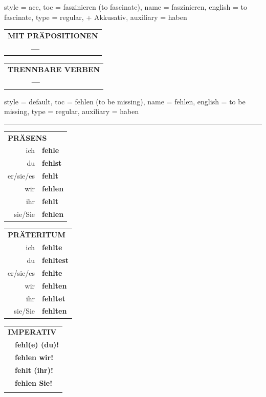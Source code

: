 \begin{verbentry}{
  style = {acc},
  toc = {faszinieren (to fascinate)},
  name = {faszinieren},
  english = {to fascinate},
  type = {regular, + Akkusativ},
  auxiliary = {haben}
}
\vspace{10pt}

\begin{tabular}{lll}
\multicolumn{3}{l}{\textbf{MIT PRÄPOSITIONEN}}\\
& \textbf{---} & \\
\end{tabular}
\hfill
\begin{tabular}{lll}
\multicolumn{3}{l}{\textbf{TRENNBARE VERBEN}}\\
& \textbf{---} & \\
\end{tabular}

\vspace{-5pt}
\end{verbentry}

\begin{verbentry}{
  style = {default},
  toc = {fehlen (to be missing)},
  name = {fehlen},
  english = {to be missing},
  type = {regular},
  auxiliary = {haben}
}
 
    
     \vspace{5pt}

    \hrule
    
    \vspace{5pt}

  \begin{tabular}{rl}
     \multicolumn{2}{l}{\textbf{PRÄSENS} }\\
    ich & \textbf{fehle}\\
    du & \textbf{fehlst}\\
    er/sie/es & \textbf{fehlt}\\
    wir & \textbf{fehlen}\\
    ihr & \textbf{fehlt}\\
    sie/Sie & \textbf{fehlen}\\
  \end{tabular}
  \hfill
     \begin{tabular}{rl}
    \multicolumn{2}{l}{\textbf{PRÄTERITUM} }\\
    ich & \textbf{fehlte}\\
    du & \textbf{fehltest}\\
    er/sie/es & \textbf{fehlte}\\
    wir & \textbf{fehlten}\\
    ihr & \textbf{fehltet}\\
    sie/Sie & \textbf{fehlten}\\
  \end{tabular}
  \hfill
  \begin{tabular}{rl}
     \multicolumn{2}{l}{\textbf{IMPERATIV} }\\
   & \textbf{fehl(e) (du)!}\\
   & \textbf{fehlen wir!}\\
   & \textbf{fehlt (ihr)!}\\
   & \textbf{fehlen Sie!}\\
   & \vspace{10pt}
  \end{tabular}


\end{verbentry}
